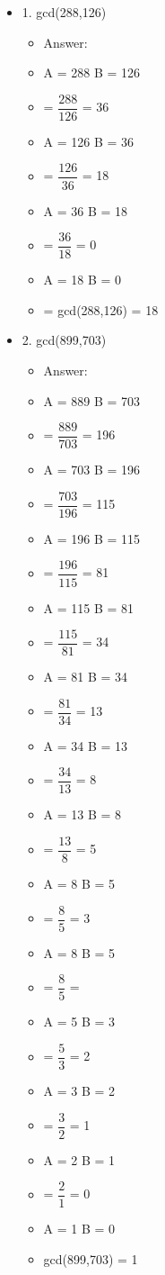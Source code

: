\documentclass[11pt]{article}
\begin{document}
\begin{itemize}

\item 1. gcd(288,126)

\begin{itemize}

\item Answer: 
\item A = 288 B = 126
\item = ${\dfrac{288}{126}}$ = 36 
\item A = 126 B = 36
\item  = ${\dfrac{126}{36}}$ = 18
\item A = 36 B = 18
\item = ${\dfrac{36}{18}}$ = 0
\item A = 18 B = 0
\item = gcd(288,126) = 18 

\end{itemize} 


\item 2. gcd(899,703)

\begin{itemize}

\item Answer: 
\item A = 889 B = 703
\item = ${\dfrac{889}{703}}$ = 196
\item A = 703 B = 196
\item = ${\dfrac{703}{196}}$ = 115
\item A = 196 B = 115
\item = ${\dfrac{196}{115}}$ = 81
\item A = 115 B = 81
\item = ${\dfrac{115}{81}}$ = 34 
\item A = 81 B = 34
\item = ${\dfrac{81}{34}}$ = 13
\item A = 34 B = 13
\item = ${\dfrac{34}{13}}$ = 8
\item A = 13 B = 8
\item = ${\dfrac{13}{8}}$ = 5 
\item A = 8 B = 5
\item = ${\dfrac{8}{5}}$ = 3
\item A = 8 B = 5
\item = ${\dfrac{8}{5}}$ = 
\item A = 5 B = 3
\item = ${\dfrac{5}{3}}$ = 2
\item A = 3 B = 2
\item = ${\dfrac{3}{2}}$ = 1
\item A = 2 B = 1
\item = ${\dfrac{2}{1}}$ = 0
\item A = 1 B = 0
\item gcd(899,703) = 1








\end{itemize} 

\end{itemize} 
\end{document}
